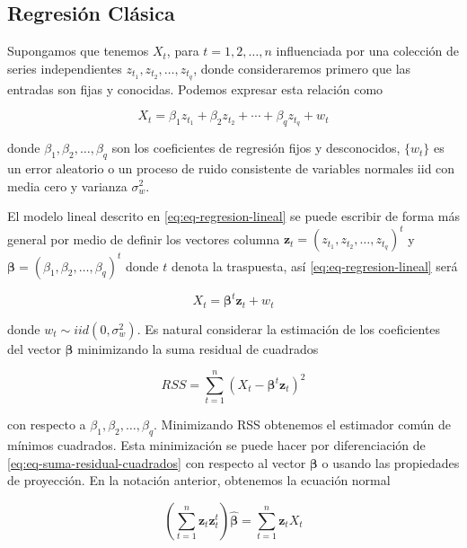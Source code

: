\documentclass[12pt,]{krantz}
\theoremstyle{definition}
\theoremstyle{definition}
\theoremstyle{definition}
\theoremstyle{remark}
\begin{document}
\subsection{Regresión Clásica}\label{regresion-clasica}

Supongamos que tenemos \(X_t\), para \(t=1,2,\ldots,n\) influenciada por
una colección de series independientes
\(z_{t_1},z_{t_2},\ldots,z_{t_q}\), donde consideraremos primero que las
entradas son fijas y conocidas. Podemos expresar esta relación como

\begin{equation}
X_t=\beta_1z_{t_1}+\beta_2z_{t_2}+\cdots+\beta_qz_{t_q}+w_t
\label{eq:eq-regresion-lineal}
\end{equation}

donde \(\beta_1,\beta_2,\ldots,\beta_q\) son los coeficientes de
regresión fijos y desconocidos, \(\{w_t\}\) es un error aleatorio o un
proceso de ruido consistente de variables normales iid con media cero y
varianza \(\sigma_w^2\).

El modelo lineal descrito en \eqref{eq:eq-regresion-lineal} se puede
escribir de forma más general por medio de definir los vectores columna
\(\mathbf{z}_t=(z_{t_1},z_{t_2},\ldots,z_{t_q})^t\) y
\(\mathbf{\beta}=(\beta_1,\beta_2,\ldots,\beta_q)^t\) donde \(t\) denota
la traspuesta, así \eqref{eq:eq-regresion-lineal} será

\begin{equation}
X_t=\mathbf{\beta}^t\mathbf{z}_t+w_t
\label{eq:eq-regresion-lineal-2}
\end{equation}

donde \(w_t\sim iid(0,\sigma_w^2)\). Es natural considerar la estimación
de los coeficientes del vector \(\mathbf{\beta}\) minimizando la suma
residual de cuadrados

\begin{equation}
RSS=\sum_{t=1}^{n}(X_t-\mathbf{\beta}^t\mathbf{z}_t)^2
\label{eq:eq-suma-residual-cuadrados}
\end{equation}

con respecto a \(\beta_1,\beta_2,\ldots,\beta_q\). Minimizando RSS
obtenemos el estimador común de mínimos cuadrados. Esta minimización se
puede hacer por diferenciación de \eqref{eq:eq-suma-residual-cuadrados}
con respecto al vector \(\mathbf{\beta}\) o usando las propiedades de
proyección. En la notación anterior, obtenemos la ecuación normal

\begin{equation}
\left(\sum_{t=1}^{n}\mathbf{z}_t\mathbf{z}_t^t\right)\hat{\mathbf{\beta}}=\sum_{t=1}^{n}\mathbf{z}_tX_t
\label{eq:eq-regresion-lineal-normal}
\end{equation}
\end{document}
